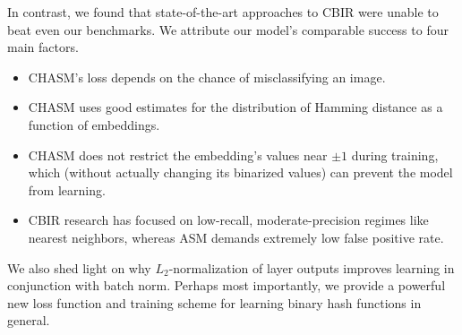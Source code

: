 \documentclass{article}
\begin{document}
\begin{multicols}{2}
In contrast, we found that state-of-the-art approaches to CBIR were unable to beat even our benchmarks.
We attribute our model's comparable success to four main factors.
\begin{itemize}
\item CHASM's loss depends on the chance of misclassifying an image.
\item CHASM uses good estimates for the distribution of Hamming distance as a function of embeddings.
\item CHASM does not restrict the embedding's values near $\pm1$ during training, which (without actually changing its binarized values) can prevent the model from learning.
\item CBIR research has focused on low-recall, moderate-precision regimes like nearest neighbors, whereas ASM demands extremely low false positive rate.
\end{itemize}

We also shed light on why $L_2$-normalization of layer outputs improves learning in conjunction with batch norm.
Perhaps most importantly, we provide a powerful new loss function and training scheme for learning binary hash functions in general.



\end{multicols}
\end{document}
